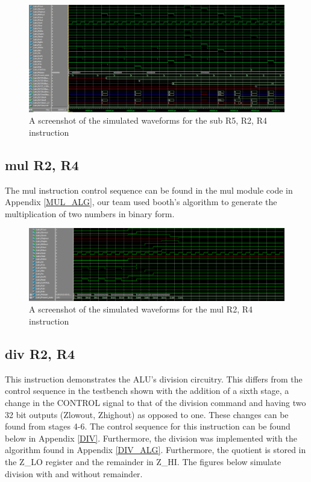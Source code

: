 \documentclass{article}
\begin{document}
    \begin{figure}[h!]
        \begin{center}
            \includegraphics[width=15cm]{SUB_FINAL.png}
            \caption{A screenshot of the simulated waveforms for the sub R5, R2, R4 instruction}
        \end{center}
    \end{figure}
     
    \subsection{mul R2, R4}
    
    The mul instruction control sequence can be found in the mul module code in Appendix \ref{MUL_ALG}, our team used booth's algorithm to generate the multiplication of two numbers in binary form. 
    
    \begin{figure}[h!]
        \begin{center}
            \includegraphics[width=15cm]{mul}
            \caption{A screenshot of the simulated waveforms for the mul R2, R4 instruction}
        \end{center}
    \end{figure}

    \subsection{div R2, R4}
    
    This instruction demonstrates the ALU's division circuitry. This differs from the control sequence in the testbench shown with the addition of a sixth stage, a change in the CONTROL signal to that of the division command and having two 32 bit outputs (Zlowout, Zhighout) as opposed to one. These changes can be found from stages 4-6. The control sequence for this instruction can be found below in Appendix \ref{DIV}. Furthermore, the division was implemented with the algorithm found in Appendix \ref{DIV_ALG}. Furthermore, the quotient is stored in the Z\_LO register and the remainder in Z\_HI. The figures below simulate division with and without remainder.
    
\end{document}
